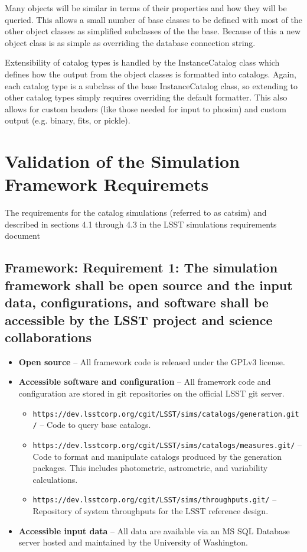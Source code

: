 \documentclass[]{article}
\begin{document}
{Many objects will be similar in terms of their properties and how they will be queried.
This allows a small number of base classes to be defined with most of the other object
classes as simplified subclasses of the the base.
Because of this a new object class is as simple as overriding the database connection string.

Extensibility of catalog types is handled by the InstanceCatalog class which defines how
the output from the object classes is formatted into catalogs.  Again, each catalog
type is a subclass of the base InstanceCatalog class, so extending to other catalog
types simply requires overriding the default formatter.  This also allows for custom headers
(like those needed for input to phosim) and custom output (e.g. binary, fits, or pickle).

\section{Validation of the Simulation Framework Requiremets}
The requirements for the catalog simulations (referred to as catsim) and described in sections
4.1 through 4.3 in the LSST simulations requirements document \citep{requirements}

\subsection{Framework: Requirement 1: The simulation framework shall be open source and the input data, configurations,
and software shall be accessible by the LSST project and science collaborations}
\begin{itemize}
\item {\bf Open source} -- All framework code is released under the GPLv3 license.
\item {\bf Accessible software and configuration} -- All framework code and configuration are 
stored in git repositories on the official LSST git server.
\begin{itemize}
\item {\tt https://dev.lsstcorp.org/cgit/LSST/sims/catalogs/generation.git/} -- Code to query
base catalogs.
\item {\tt https://dev.lsstcorp.org/cgit/LSST/sims/catalogs/measures.git/} -- Code to format
and manipulate catalogs produced by the generation packages.  This includes photometric, 
astrometric, and variability calculations.
\item {\tt https://dev.lsstcorp.org/cgit/LSST/sims/throughputs.git/} -- Repository
of system throughputs for the LSST reference design.
\end{itemize}
\item {\bf Accessible input data} -- All data are available via an MS SQL Database server
hosted and maintained by the University of Washington.
\end{itemize}

}
\end{document}
